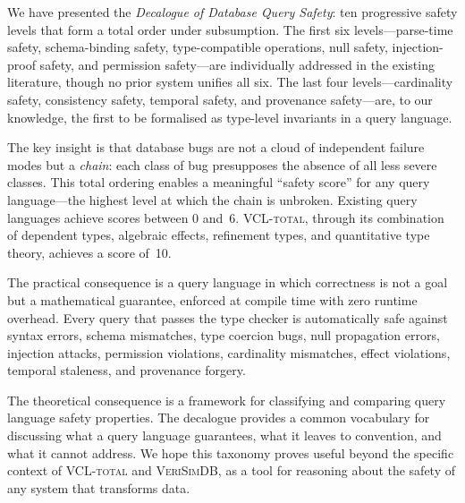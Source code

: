 \documentclass[11pt,a4paper]{article}
\newcommand{\VCL}{\textsc{VCL-total}}
\newcommand{\VeriSimDB}{\textsc{VeriSimDB}}
\begin{document}
We have presented the \emph{Decalogue of Database Query Safety}:
ten progressive safety levels that form a total order under
subsumption.  The first six levels---parse-time safety, schema-binding
safety, type-compatible operations, null safety, injection-proof
safety, and permission safety---are individually addressed in the
existing literature, though no prior system unifies all six.  The
last four levels---cardinality safety, consistency safety, temporal
safety, and provenance safety---are, to our knowledge, the first to
be formalised as type-level invariants in a query language.

The key insight is that database bugs are not a cloud of independent
failure modes but a \emph{chain}: each class of bug presupposes the
absence of all less severe classes.  This total ordering enables a
meaningful ``safety score'' for any query language---the highest level
at which the chain is unbroken.  Existing query languages achieve
scores between 0 and~6.  \VCL{}, through its combination of dependent
types, algebraic effects, refinement types, and quantitative type
theory, achieves a score of~10.

The practical consequence is a query language in which correctness
is not a goal but a mathematical guarantee, enforced at compile time
with zero runtime overhead.  Every query that passes the type checker
is automatically safe against syntax errors, schema mismatches, type
coercion bugs, null propagation errors, injection attacks, permission
violations, cardinality mismatches, effect violations, temporal
staleness, and provenance forgery.

The theoretical consequence is a framework for classifying and
comparing query language safety properties.  The decalogue provides a
common vocabulary for discussing what a query language guarantees, what
it leaves to convention, and what it cannot address.  We hope this
taxonomy proves useful beyond the specific context of \VCL{} and
\VeriSimDB{}, as a tool for reasoning about the safety of any system
that transforms data.
\end{document}
